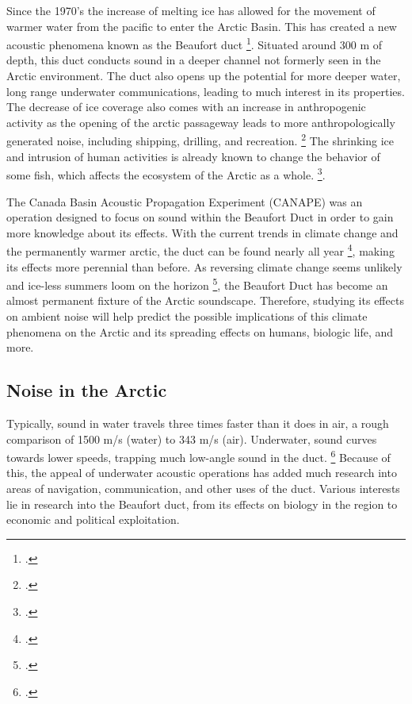 Since the 1970's the increase of melting ice has allowed for the movement of warmer water from the pacific to enter the Arctic Basin. This has created a new acoustic phenomena known as the Beaufort duct \footcite[]{toole2010influences}. Situated around 300 m of depth, this duct conducts sound in a deeper channel not formerly seen in the Arctic environment. The duct also opens up the potential for more deeper water, long range underwater communications, leading to much interest in its properties. The decrease of ice coverage also comes with an increase in anthropogenic activity as the opening of the arctic passageway leads to more anthropologically generated noise, including shipping, drilling, and recreation. \footcite[]{judson2010trends} The shrinking ice and intrusion of human activities is already known to change the behavior of some fish, which affects the ecosystem of the Arctic as a whole. \footcite[]{ivanova2020shipping}.

The Canada Basin Acoustic Propagation Experiment (CANAPE) was an operation designed to focus on sound within the Beaufort Duct in order to gain more knowledge about its effects. With the current trends in climate change and the permanently warmer arctic, the duct can be found nearly all year \footcite[]{duda2017acoustic}, making its effects more perennial than before. As reversing climate change seems unlikely and ice-less summers loom on the horizon \footcite[]{notz2020}, the Beaufort Duct has become an almost permanent fixture of the Arctic soundscape. Therefore, studying its effects on ambient noise will help predict the possible implications of this climate phenomena on the Arctic and its spreading effects on humans, biologic life, and more.



\subsection{Noise in the Arctic}    \label{intro_arctic_noise}

Typically, sound in water travels three times faster than it does in air, a rough comparison of 1500 m/s (water) to 343 m/s (air). Underwater, sound curves towards lower speeds, trapping much low-angle sound in the duct. \footcite[]{chen2020tempo}  Because of this, the appeal of underwater acoustic operations has added much research into areas of navigation, communication, and other uses of the duct. Various interests lie in research into the Beaufort duct, from its effects on biology in the region to economic and political exploitation. 

